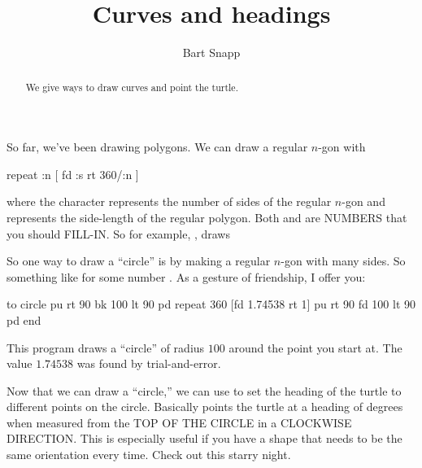 \documentclass[noauthor,nooutcomes,12pt]{ximera}
\title{Curves and headings}
\author{Bart Snapp}
\begin{document}
\begin{abstract}
  We give ways to draw curves and point the turtle.
\end{abstract}
\maketitle

\nameblankgen

\begin{multicols*}{2}
  So far, we've been drawing polygons. We can draw a regular $n$-gon
  with
\begin{logo}
  repeat :n [ fd :s rt 360/:n ]
\end{logo}
where the character  represents the number of sides of the
regular $n$-gon and  represents the side-length of the regular
polygon. Both  and  are NUMBERS that you should
FILL-IN. So for example, , draws
\begin{logoout}
\end{logoout}
So one way to draw a ``circle'' is by making a regular $n$-gon with
many sides. So something like  for some
number . As a gesture of friendship, I offer you:
\begin{logo}
to circle
pu rt 90 bk 100 lt 90 pd
repeat 360 [fd 1.74538 rt 1]
pu rt 90 fd 100 lt 90 pd
end
\end{logo}
This program draws a ``circle'' of radius $100$ around the point you
start at. The value $1.74538$ was found by trial-and-error.


Now that we can draw a ``circle,'' we can use  to set the
heading of the turtle to different points on the circle. Basically
 points the turtle at a heading of \lc{\#} degrees when
measured from the TOP OF THE CIRCLE in a CLOCKWISE DIRECTION. This is
especially useful if you have a shape that needs to be the same
orientation every time. Check out this starry night. 


\end{multicols*}
\end{document}
